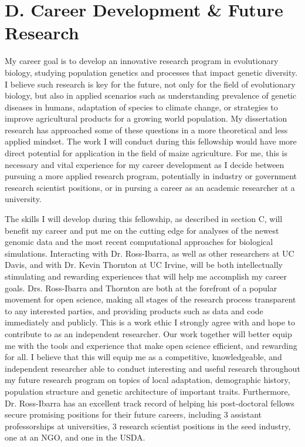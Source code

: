 \section*{D. Career Development \& Future Research}\vspace{-1ex}
My career goal is to develop an innovative research program in evolutionary biology, studying population genetics and processes that impact genetic diversity. I believe such research is key for the future, not only for the field of evolutionary biology, but also in applied scenarios such as understanding prevalence of genetic diseases in humans, adaptation of species to climate change, or strategies to improve agricultural products for a growing world population. My dissertation research has approached some of these questions in a more theoretical and less applied mindset. The work I will conduct during this fellowship would have more direct potential for application in the field of maize agriculture. For me, this is necessary and vital experience for my career development as I decide between pursuing a more applied research program, potentially in industry or government research scientist positions, or in pursing a career as an academic researcher at a university.

The skills I will develop during this fellowship, as described in section C, will benefit my career and put me on the cutting edge for analyses of the newest genomic data and the most recent computational approaches for biological simulations. Interacting with Dr. Ross\--Ibarra, as well as other researchers at UC Davis, and with Dr. Kevin Thornton at UC Irvine, will be both intellectually stimulating and rewarding experiences that will help me accomplish my career goals. Drs. Ross\--Ibarra and Thornton are both at the forefront of a popular movement for open science, making all stages of the research process transparent to any interested parties, and providing products such as data and code immediately and publicly. This is a work ethic I strongly agree with and hope to contribute to as an independent researcher. Our work together will better equip me with the tools and experience that make open science efficient, and rewarding for all. I believe that this will equip me as a competitive, knowledgeable, and independent researcher able to conduct interesting and useful research throughout my future research program on topics of local adaptation, demographic history, population structure and genetic architecture of important traits. Furthermore, Dr. Ross-Ibarra has an excellent track record of helping his post-doctoral fellows secure promising positions for their future careers, including 3 assistant professorships at universities, 3 research scientist positions in the seed industry, one at an NGO, and one in the USDA.\vspace{-1ex} 

